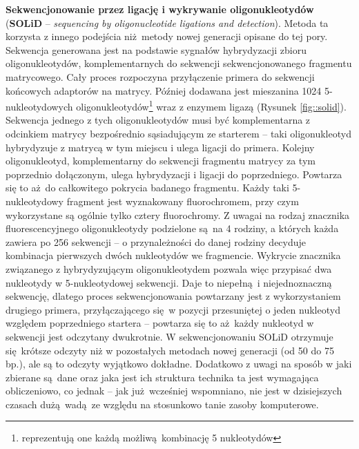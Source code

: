 \documentclass[two column, twoside, a4paper]{article}
\begin{document}
\textbf{Sekwencjonowanie przez ligację i wykrywanie oligonukleotydów} (\textbf{SOLiD} -- \textit{sequencing by oligonucleotide ligations and detection}). Metoda ta korzysta z innego podejścia niż metody nowej generacji opisane do tej pory. Sekwencja generowana jest na podstawie sygnałów hybrydyzacji zbioru oligonukleotydów, komplementarnych do sekwencji sekwencjonowanego fragmentu matrycowego. Cały proces rozpoczyna przyłączenie primera do sekwencji końcowych adaptorów na matrycy. Później dodawana jest mieszanina 1024 5-nukleotydowych oligonukleotydów\footnote{reprezentują one każdą możliwą kombinację 5 nukleotydów} wraz z enzymem ligazą (Rysunek \ref{fig::solid}). Sekwencja jednego z tych oligonukleotydów musi być komplementarna z odcinkiem matrycy bezpośrednio sąsiadującym ze starterem -- taki oligonukleotyd hybrydyzuje z matrycą w tym miejscu i ulega ligacji do primera. Kolejny oligonukleotyd, komplementarny do sekwencji fragmentu matrycy za tym poprzednio dołączonym, ulega hybrydyzacji i ligacji do poprzedniego. Powtarza się to aż do całkowitego pokrycia badanego fragmentu. Każdy taki 5-nukleotydowy fragment jest wyznakowany fluorochromem, przy czym wykorzystane są ogólnie tylko cztery fluorochromy. Z uwagai na rodzaj znacznika fluorescencyjnego oligonukleotydy podzielone są na 4 rodziny, a których każda zawiera po 256 sekwencji -- o przynależności do danej rodziny decyduje kombinacja pierwszych dwóch nukleotydów we fragmencie. Wykrycie znacznika związanego z hybrydyzującym oligonukleotydem pozwala więc przypisać dwa nukleotydy w 5-nukleotydowej sekwencji. Daje to niepełną i niejednoznaczną sekwencję, dlatego proces sekwencjonowania powtarzany jest z wykorzystaniem drugiego primera, przyłączającego się w pozycji przesuniętej o jeden nukleotyd względem poprzedniego startera -- powtarza się to aż każdy nukleotyd w sekwencji jest odczytany dwukrotnie. W sekwencjonowaniu SOLiD otrzymuje się krótsze odczyty niż w pozostałych metodach nowej generacji (od 50 do 75 bp.), ale są to odczyty wyjątkowo dokładne. Dodatkowo z uwagi na sposób w jaki zbierane są dane oraz jaka jest ich struktura technika ta jest wymagająca obliczeniowo, co jednak -- jak już wcześniej wspomniano, nie jest w dzisiejszych czasach dużą wadą ze względu na stosunkowo tanie zasoby komputerowe. \autocite{Godwin2016} \autocite{Brown2019}
\end{document}
